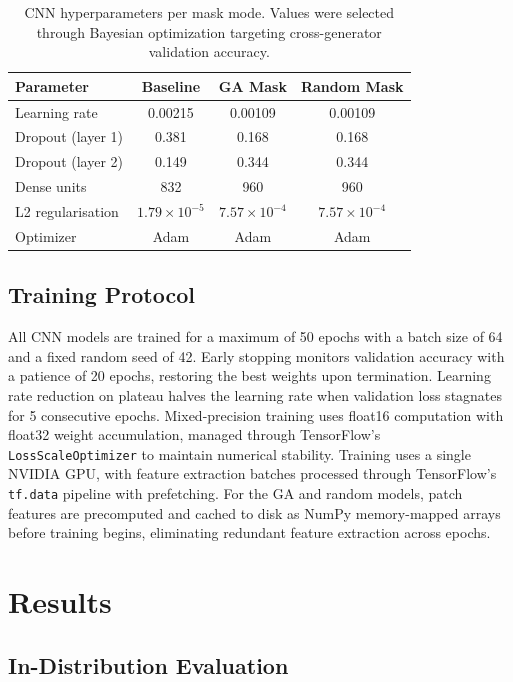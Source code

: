 \documentclass[runningheads]{llncs}
\begin{document}
\begin{table}[!htbp]
\centering
\caption{CNN hyperparameters per mask mode. Values were selected through Bayesian optimization targeting cross-generator validation accuracy.}
\label{tab:cnn_params}
\begin{tabular}{@{}lccc@{}}
\toprule
Parameter & Baseline & GA Mask & Random Mask \\
\midrule
Learning rate & 0.00215 & 0.00109 & 0.00109 \\
Dropout (layer 1) & 0.381 & 0.168 & 0.168 \\
Dropout (layer 2) & 0.149 & 0.344 & 0.344 \\
Dense units & 832 & 960 & 960 \\
L2 regularisation & $1.79 \times 10^{-5}$ & $7.57 \times 10^{-4}$ & $7.57 \times 10^{-4}$ \\
Optimizer & Adam & Adam & Adam \\
\bottomrule
\end{tabular}
\end{table}

\subsection{Training Protocol}

All CNN models are trained for a maximum of 50 epochs with a batch size of 64 and a fixed random seed of 42. Early stopping monitors validation accuracy with a patience of 20 epochs, restoring the best weights upon termination. Learning rate reduction on plateau halves the learning rate when validation loss stagnates for 5 consecutive epochs. Mixed-precision training uses float16 computation with float32 weight accumulation, managed through TensorFlow's \texttt{LossScaleOptimizer} to maintain numerical stability. Training uses a single NVIDIA GPU, with feature extraction batches processed through TensorFlow's \texttt{tf.data} pipeline with prefetching. For the GA and random models, patch features are precomputed and cached to disk as NumPy memory-mapped arrays before training begins, eliminating redundant feature extraction across epochs.

\section{Results}

\subsection{In-Distribution Evaluation}
\end{document}
